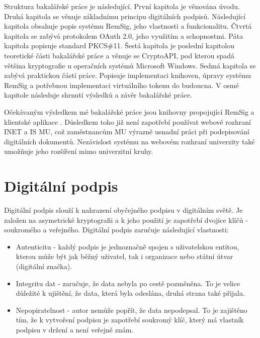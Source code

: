 \documentclass[]{fithesis3}
\begin{document}
Struktura bakalářské práce je následující. První kapitola je věnována úvodu. Druhá kapitola se věnuje základnímu principu digitálních podpisů. Následující kapitola obsahuje popis systému RemSig, jeho vlastnosti a funkcionalitu. Čtvrtá kapitola se zabývá protokolem OAuth 2.0, jeho využitím a schopnostmi. Páta kapitola popisuje standard PKCS\#11. Šestá kapitola je poslední kapitolou teoretické části bakalářské práce a věnuje se CryptoAPI, pod kterou spadá většina kryptografie u operačních systémů Microsoft Windows. Sedmá kapitola se zabývá praktickou částí práce. Popisuje implementaci knihoven, úpravy systému RemSig a potřebnou implementaci virtuálního tokenu do budoucna. V osmé kapitole následuje shrnutí výsledků a závěr bakalářské práce.

Očekávaným výsledkem mé bakalářské práce jsou knihovny propojující RemSig a klientské aplikace . Důsledkem toho již není zapotřebí používat webové rozhraní INET a IS MU, což zaměstnancům MU výrazně usnadní práci při podepisování digitálních dokumentů. Nezávislost systému na webovém rozhraní univerzity také umožňuje jeho rozšíření mimo univerzitní kruhy.


\chapter{Digitální podpis}

Digitální podpis slouží k nahrazení obyčejného podpisu v digitálním světě. Je založen na asymetrické kryptografii a k jeho použití je zapotřebí dvojice klíčů - soukromého a veřejného. Digitální podpis zaručuje následující vlastnosti:
\begin{itemize}
\item Autenticitu - každý podpis je jednoznačně spojen s uživatelskou entitou, kterou může být jak běžný uživatel, tak i organizace nebo státní útvar (digitální značka).
\item Integritu dat - zaručuje, že data nebyla po cestě pozměněna. To je velice důležité k ujištění, že data, která byla odeslána, druhá strana také přijala.
\item Nepopiratelnost - autor nemůže popřít, že data nepodepsal. To je zajištěno tím, že k vytvoření podpisu je zapotřebí soukromý klíč, který má vlastník podpisu v držení a není veřejně znám.
\end{itemize} 
\end{document}
